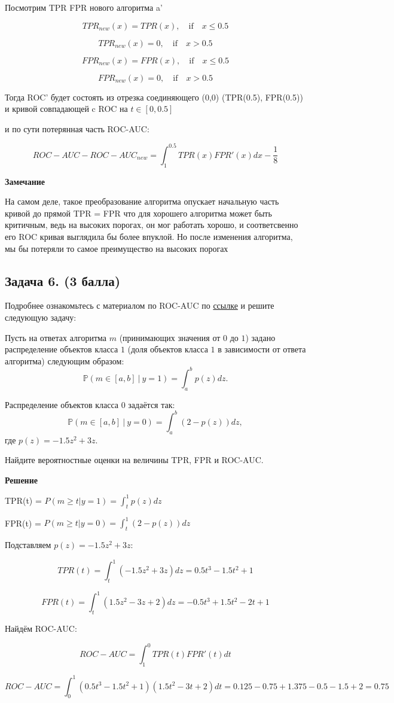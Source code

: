 \documentclass{article}
\begin{document}
Посмотрим TPR FPR нового алгоритма a'

$$TPR_{new}(x) = TPR(x),\quad \text{if}  \quad x \leq 0.5$$

$$TPR_{new}(x) = 0,\quad \text{if}  \quad x > 0.5$$

$$FPR_{new}(x) = FPR(x),\quad \text{if}  \quad x \leq 0.5$$

$$FPR_{new}(x) = 0,\quad \text{if}  \quad x > 0.5$$

Тогда ROC' будет состоять из отрезка соединяющего (0,0) (TPR(0.5), FPR(0.5)) и кривой совпадающей c ROC на $t \in [0, 0.5]$

и по сути потерянная часть ROC-AUC:

$$ROC-AUC - ROC-AUC_{new}= \int_1^{0.5} TPR(x) FPR'(x)dx - \frac{1}{8}$$

\noindent
\textbf{Замечание}

На самом деле, такое преобразование алгоритма опускает начальную часть кривой до прямой TPR = FPR что для хорошего алгоритма может быть критичным, ведь на высоких порогах, он мог работать хорошо, и соответсвенно его ROC кривая выглядила бы более впуклой. Но после изменения алгоритма, мы бы потеряли то самое преимущество на высоких порогах


\subsection*{Задача 6. (3 балла)}

    Подробнее ознакомьтесь с материалом по ROC-AUC по \href{https://alexanderdyakonov.wordpress.com/2017/07/28/auc-roc-%D0%BF%D0%BB%D0%BE%D1%89%D0%B0%D0%B4%D1%8C-%D0%BF%D0%BE%D0%B4-%D0%BA%D1%80%D0%B8%D0%B2%D0%BE%D0%B9-%D0%BE%D1%88%D0%B8%D0%B1%D0%BE%D0%BA/}{ссылке} и решите следующую задачу:

    \noindent
    Пусть на ответах алгоритма $m$ (принимающих значения от $0$ до $1$) задано распределение объектов класса $1$ (доля объектов класса $1$ в зависимости от ответа алгоритма) следующим образом:
    $$
        \mathbb{P} (m \in [a, b] \ | \ y = 1) = \int_a^b p(z)dz.
    $$

    \noindent
    Распределение объектов класса 0 задаётся так:
    $$
        \mathbb{P} (m \in [a, b] \ | \ y = 0) = \int_a^b (2 - p(z))dz,
    $$
    где $p(z) = -1.5z^2 + 3z$.

    \noindent
    Найдите вероятностные оценки на величины TPR, FPR и ROC-AUC.


\noindent
\textbf{Решение}

\noindent TPR(t) = $P(m \geq t | y = 1) = \int_t^1 p(z)dz$

\noindent FPR(t) = $P(m \geq t | y = 0) = \int_t^1 (2 - p(z))dz$

\noindent Подставляем $p(z) = -1.5z^2 + 3z$:

$$TPR(t) = \int_t^1 (-1.5z^2 + 3z)dz = 0.5t^3 - 1.5t^2 + 1$$

$$FPR(t) = \int_t^1 (1.5z^2 - 3z + 2)dz = -0.5t^3 + 1.5t^2 - 2t + 1$$

\noindent
Найдём ROC-AUC:


$$ROC-AUC = \int_1^0 TPR(t) FPR'(t) dt$$

$$ROC-AUC= \int_0^1 (0.5t^3 - 1.5t^2 + 1)(1.5t^2 - 3t + 2)dt =  0.125 - 0.75 + 1.375 - 0.5 - 1.5 + 2 = 0.75$$
\end{document}
